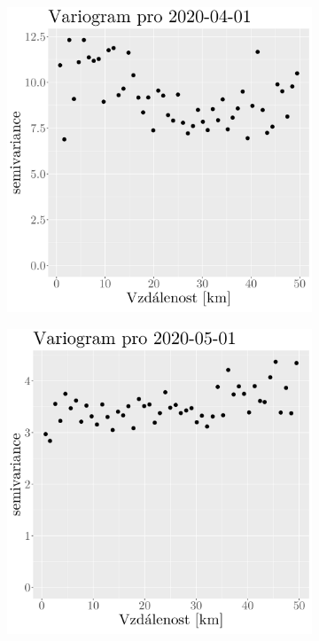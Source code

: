 \begin{figure}
\begin{subfigure}{0.30\textwidth}
		\caption{}
		\label{fig:variogram3}
	\end{subfigure}
	\hfill
	\begin{subfigure}{0.30\textwidth}
		\includegraphics[width=\textwidth]{img/ch2/variograms/variogram_max15cm4.png}
		\caption{}
		\label{fig:variogram4}
	\end{subfigure}
	\hfill
	\begin{subfigure}{0.30\textwidth}
		\includegraphics[width=\textwidth]{img/ch2/variograms/variogram_max15cm5.png}

\end{subfigure}
\end{figure}
